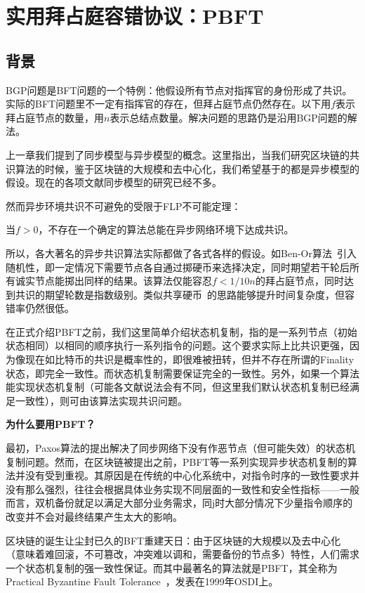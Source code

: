 \section{实用拜占庭容错协议：PBFT}
\subsection{背景}
BGP问题是BFT问题的一个特例：他假设所有节点对指挥官的身份形成了共识。实际的BFT问题里不一定有指挥官的存在，但拜占庭节点仍然存在。以下用$f$表示拜占庭节点的数量，用$n$表示总结点数量。解决问题的思路仍是沿用BGP问题的解法。

上一章我们提到了同步模型与异步模型的概念。这里指出，当我们研究区块链的共识算法的时候，鉴于区块链的大规模和去中心化，我们希望基于的都是异步模型的假设。现在的各项文献同步模型的研究已经不多。

然而异步环境共识不可避免的受限于FLP不可能定理：
\begin{theorem}
	当$f>0$，不存在一个确定的算法总能在异步网络环境下达成共识。
\end{theorem}
所以，各大著名的异步共识算法实际都做了各式各样的假设。如Ben-Or算法~\cite{ben1983another}引入随机性，即一定情况下需要节点各自通过掷硬币来选择决定，同时期望若干轮后所有诚实节点能掷出同样的结果。该算法仅能容忍$f<1/10n$的拜占庭节点，同时达到共识的期望轮数是指数级别。类似共享硬币~\cite{bracha1987asynchronous}的思路能够提升时间复杂度，但容错率仍然很低。

在正式介绍PBFT之前，我们这里简单介绍状态机复制，指的是一系列节点（初始状态相同）以相同的顺序执行一系列指令的问题。这个要求实际上比共识更强，因为像现在如比特币的共识是概率性的，即很难被扭转，但并不存在所谓的Finality状态，即完全一致性。而状态机复制需要保证完全的一致性。另外，如果一个算法能实现状态机复制（可能各文献说法会有不同，但这里我们默认状态机复制已经满足一致性），则可由该算法实现共识问题。

\textbf{为什么要用PBFT？}

最初，Paxos\cite{lamport2001paxos}算法的提出解决了同步网络下没有作恶节点（但可能失效）的状态机复制问题。然而，在区块链被提出之前，PBFT等一系列实现异步状态机复制的算法并没有受到重视。其原因是在传统的中心化系统中，对指令时序的一致性要求并没有那么强烈，往往会根据具体业务实现不同层面的一致性和安全性指标——一般而言，双机备份就足以满足大部分业务需求，同j时大部分情况下少量指令顺序的改变并不会对最终结果产生太大的影响。

区块链的诞生让尘封已久的BFT重建天日：由于区块链的大规模以及去中心化（意味着难回滚，不可篡改，冲突难以调和，需要备份的节点多）特性，人们需求一个状态机复制的强一致性保证。而其中最著名的算法就是PBFT，其全称为Practical Byzantine Fault Tolerance~\cite{castro1999practical}，发表在1999年OSDI上。

